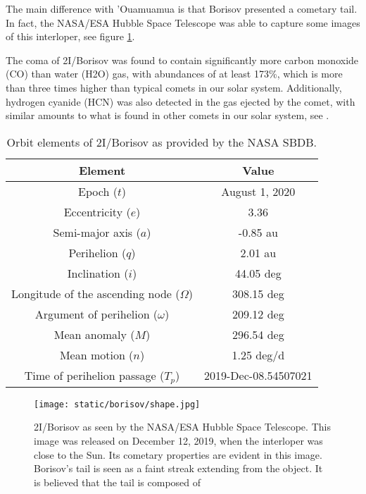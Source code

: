 The main difference with 'Ouamuamua is that Borisov presented a cometary tail.
In fact, the NASA/ESA Hubble Space Telescope was able to capture some images of
this interloper, see figure \ref{fig:borisov_shape}.

The coma of 2I/Borisov was found to contain significantly more carbon monoxide
(CO) than water (H2O) gas, with abundances of at least 173\%, which is more than
three times higher than typical comets in our solar system. Additionally,
hydrogen cyanide (HCN) was also detected in the gas ejected by the comet, with
similar amounts to what is found in other comets in our solar system, see
\cite{bodewits2020}.


\begin{table}[H]
  \centering
  \begin{tabular}{|c|c|}
    \hline
    Element & Value \\
    \hline
    Epoch ($t$) & August 1, 2020 \\
    Eccentricity ($e$) & 3.36 \\
    Semi-major axis ($a$) & -0.85 au \\
    Perihelion ($q$) & 2.01 au \\
    Inclination ($i$) & 44.05 deg \\
    Longitude of the ascending node ($\Omega$) & 308.15 deg \\
    Argument of perihelion ($\omega$) & 209.12 deg \\
    Mean anomaly ($M$) & 296.54 deg \\
    Mean motion ($n$) & 1.25 deg/d \\
    Time of perihelion passage ($T_p$) & 2019-Dec-08.54507021 \\
    \hline
  \end{tabular}
  \caption{Orbit elements of 2I/Borisov as provided by the NASA SBDB.}
  \label{tab:borisov_elements}
\end{table}

\begin{figure}[H]
  \centering
  \texttt{[image: static/borisov/shape.jpg]}
\caption[Borisov as seen by the NASA/ESA Hubble Space Telescope]{
  2I/Borisov as seen by the NASA/ESA Hubble Space Telescope. This image was
  released on December 12, 2019, when the interloper was close to the Sun. Its
  cometary properties are evident in this image. Borisov's tail is seen as a
faint streak extending from the object. It is believed that the tail is composed
of 
  }
  \label{fig:borisov_shape}
\end{figure}

